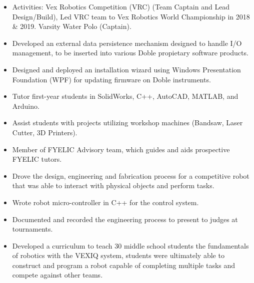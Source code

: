 \documentclass[10pt,a4paper,ragged2e,withhyper]{altacv}
\begin{document}
\begin{paracol}{2}
    \begin{itemize}
        \item Activities: Vex Robotics Competition (VRC) (Team Captain and Lead Design/Build), Led VRC team to Vex Robotics World Championship in 2018 \& 2019. Varsity Water Polo (Captain).
    \end{itemize}
    \vspace{-1.5em} %
    \begin{itemize}
        \item Developed an external data persistence mechanism designed to handle I/O management, to be inserted into various Doble propietary software products.
        \item Designed and deployed an installation wizard using Windows Presentation Foundation (WPF) for updating firmware on Doble instruments.
    \end{itemize}

    \begin{itemize}
        \item Tutor first-year students in SolidWorks, C++, AutoCAD, MATLAB, and Arduino.
        \item Assist students with projects utilizing workshop machines (Bandsaw, Laser Cutter, 3D Printers).
        \item Member of FYELIC Advisory team, which guides and aids prospective FYELIC tutors.
    \end{itemize}

    \begin{itemize}
        \item Drove the design, engineering and fabrication process for a competitive robot that was able to interact with physical objects and perform tasks.
        \item Wrote robot micro-controller in C++ for the control system.
        \item Documented and recorded the engineering process to present to judges at tournaments.
        \item Developed a curriculum to teach 30 middle school students the fundamentals of robotics with the VEXIQ system, students were ultimately able to construct and program a robot capable of completing multiple tasks and compete against other teams.
    \end{itemize}


\end{paracol}
\end{document}
